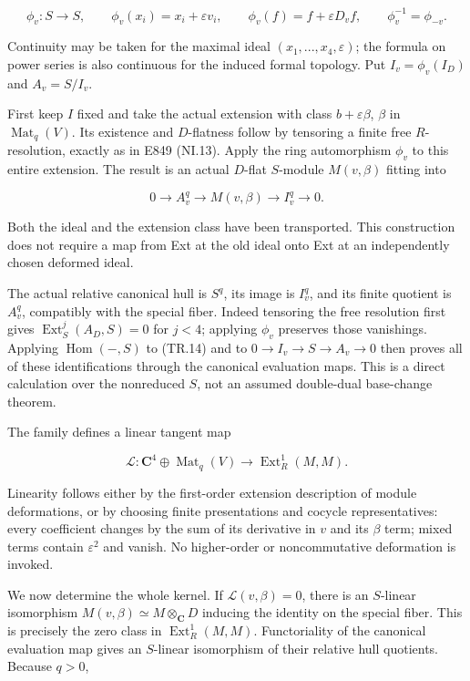 \[
 \phi_v:S\longrightarrow S,\qquad
 \phi_v(x_i)=x_i+\varepsilon v_i,\qquad
 \phi_v(f)=f+\varepsilon D_vf,\qquad
 \phi_v^{-1}=\phi_{-v}.
 \tag{TR.13}
\]

Continuity may be taken for the maximal ideal \((x_1,...,x_4,\varepsilon)\);
the formula on power series is also continuous for the induced formal
topology. Put \(I_v=\phi_v(I_D)\) and \(A_v=S/I_v\).

First keep \(I\) fixed and take the actual extension with class
\(b+\varepsilon\beta\), \(\beta\) in \(\operatorname{Mat}_q(V)\). Its existence and \(D\)-flatness follow
by tensoring a finite free \(R\)-resolution, exactly as in E849 (NI.13).
Apply the ring automorphism \(\phi_v\) to this entire extension. The result
is an actual \(D\)-flat \(S\)-module \(M(v,\beta)\) fitting into

\[
 0\longrightarrow A_v^q\longrightarrow M(v,\beta)
               \longrightarrow I_v^q\longrightarrow0.
 \tag{TR.14}
\]

Both the ideal and the extension class have been transported. This
construction does not require a map from Ext at the old ideal onto
Ext at an independently chosen deformed ideal.

The actual relative canonical hull is \(S^q\), its image is \(I_v^q\), and its
finite quotient is \(A_v^q\), compatibly with the special fiber. Indeed
tensoring the free resolution first gives \(\operatorname{Ext}^j_S(A_D,S)=0\) for \(j<4\);
applying \(\phi_v\) preserves those vanishings. Applying \(\operatorname{Hom}(-,S)\) to
(TR.14) and to \(0\to I_v\to S\to A_v\to 0\) then proves all of these identifications
through the canonical evaluation maps. This is a direct calculation
over the nonreduced \(S\), not an assumed double-dual base-change theorem.

The family defines a linear tangent map

\[
 \mathcal L:\mathbf C^4\oplus\operatorname{Mat}_q(V)
                  \longrightarrow\operatorname{Ext}^1_R(M,M).
 \tag{TR.15}
\]

Linearity follows either by the first-order extension description of
module deformations, or by choosing finite presentations and cocycle
representatives: every coefficient changes by the sum of its derivative
in \(v\) and its \(\beta\) term; mixed terms contain \(\varepsilon^2\) and vanish.
No higher-order or noncommutative deformation is invoked.

We now determine the whole kernel. If \(\mathcal L(v,\beta)=0\), there is an \(S\)-linear
isomorphism \(M(v,\beta)\simeq M\otimes_{\mathbf C}D\) inducing the identity on the special
fiber. This is precisely the zero class in \(\operatorname{Ext}^1_R(M,M)\). Functoriality
of the canonical evaluation map gives an \(S\)-linear isomorphism of their
relative hull quotients. Because \(q>0\),

